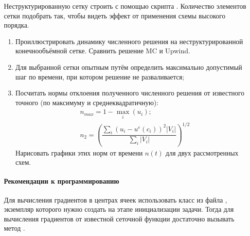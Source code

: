 Неструктурированную сетку строить с помощью скрипта .
Количество элементов сетки подобрать так, чтобы видеть эффект от применения схемы высокого порядка.

\begin{enumerate}
\item
Проиллюстрировать динамику численного решения на неструктурированной конечнообъёмной сетке.
Сравнить решение MC и Upwind.
\item
Для выбранной сетки опытным путём определить максимально допустимый шаг по времени, при котором решение не разваливается;
\item 
Посчитать нормы отклоения полученного численного решения от известного точного (по максимуму и среднеквадратичную):
\begin{align*}
&n_{max} = 1 - \max\limits_{i} (u_i); \\
&n_2 = \left(\dfrac{\sum_i { \left(u_i - u^e(c_i)\right)^2 \left| V_i \right| }}{\sum_i \left| V_i \right|}\right)^{1/2}
\end{align*}
Нарисовать графики этих норм от времени $n(t)$ для двух рассмотренных схем. 
\end{enumerate}

\paragraph{Рекомендации к программированию}
Для вычисления градиентов в центрах ячеек
использовать класс  из файла , экземпляр которого нужно создать на этапе инициализации задачи.
Тогда для вычисления градиентов от известной сеточной функции 
достаточно вызывать метод .
